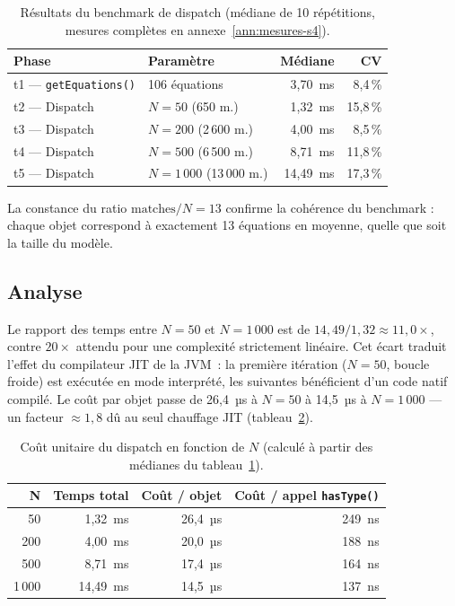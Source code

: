 \begin{table}[h]
\centering
\caption{Résultats du benchmark de dispatch (médiane de 10 répétitions,
mesures complètes en annexe~\ref{ann:mesures-s4}).}
\label{tab:sc4-dispatch}
\begin{tabular}{llrr}
\hline
\textbf{Phase} & \textbf{Paramètre} & \textbf{Médiane} & \textbf{CV} \\
\hline
t1 — \texttt{getEquations()} & 106 équations         & 3,70~ms & 8,4\,\% \\
t2 — Dispatch                & $N = 50$ (650 m.)     & 1,32~ms & 15,8\,\% \\
t3 — Dispatch                & $N = 200$ (2\,600 m.) & 4,00~ms & 8,5\,\% \\
t4 — Dispatch                & $N = 500$ (6\,500 m.) & 8,71~ms & 11,8\,\% \\
t5 — Dispatch                & $N = 1\,000$ (13\,000 m.) & 14,49~ms & 17,3\,\% \\
\hline
\end{tabular}
\end{table}

La constance du ratio $\text{matches}/N = 13$ confirme la cohérence du
benchmark : chaque objet correspond à exactement 13 équations en moyenne,
quelle que soit la taille du modèle.

\subsection{Analyse}

Le rapport des temps entre $N = 50$ et $N = 1\,000$ est de
$14{,}49/1{,}32 \approx 11{,}0\times$, contre $20\times$ attendu pour une
complexité strictement linéaire. Cet écart traduit l'effet du compilateur
JIT de la JVM~: la première itération ($N = 50$, boucle froide) est
exécutée en mode interprété, les suivantes bénéficient d'un code natif
compilé. Le coût par objet passe de 26,4~µs à $N = 50$ à 14,5~µs à
$N = 1\,000$ --- un facteur $\approx 1{,}8$ dû au seul chauffage JIT
(tableau~\ref{tab:sc4-cout-unitaire}).

\begin{table}[h]
\centering
\caption{Coût unitaire du dispatch en fonction de $N$ (calculé à partir
des médianes du tableau~\ref{tab:sc4-dispatch}).}
\label{tab:sc4-cout-unitaire}
\begin{tabular}{rrrr}
\hline
\textbf{N} & \textbf{Temps total} &
\textbf{Coût / objet} & \textbf{Coût / appel \texttt{hasType()}} \\
\hline
50     &  1,32~ms & 26,4~µs & 249~ns \\
200    &  4,00~ms & 20,0~µs & 188~ns \\
500    &  8,71~ms & 17,4~µs & 164~ns \\
1\,000 & 14,49~ms & 14,5~µs & 137~ns \\
\hline
\end{tabular}
\end{table}

